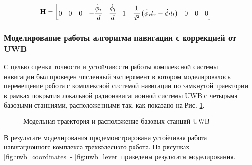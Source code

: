 \documentclass[14pt]{article}
\begin{document}
\begin{equation}
   \mathbf H = \begin{bmatrix} 0 & 0 & 0 & -\cfrac{\dot\phi_r}{d} & \cfrac{\dot\phi_l}{d} & 1 & \cfrac{1}{d^2}\left(\dot{\phi}_r  l_r-\dot{\phi}_l l_l\right) & 0 & 0 & 0 \end{bmatrix}
\end{equation}

\subsubsection{Моделирование работы алгоритма навигации с коррекцией от UWB}
С целью оценки точности и устойчивости работы комплексной системы навигации был проведен численный эксперимент в котором моделировалось перемещение робота с комплексной системой навигации по замкнутой траектории в рамках покрытия локальной радионавигационной системы UWB с четырьмя базовыми станциями, расположенными так, как показано на Рис. \ref{fig:uwb_intergated_trajectory}. 

\begin{figure}
\noindent{}
\caption{Модельная траектория и расположение базовых станций UWB}
\label{fig:uwb_intergated_trajectory}
\end{figure}

 В результате моделирования продемонстрирована устойчивая работа навигационного комплекса трехколесного робота. На рисунках \ref{fig:uwb_coordinates} - \ref{fig:uwb_lever} приведены результаты моделирования. 
 
\end{document}
